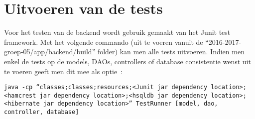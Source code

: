 \documentclass{article}
\begin{document}
\section{Uitvoeren van de tests}
Voor het testen van de backend wordt gebruik gemaakt van het Junit test framework. Met het volgende commando (uit te voeren vanuit de "`2016-2017-groep-05/app/backend/build"' folder) kan men alle tests uitvoeren. Indien men enkel de tests op de models, DAOs, controllers of database consistentie wenst uit te voeren geeft men dit mee als optie~:\\
\begin{center}
	\texttt{java -cp "`classes\test;classes\main;resources\main;<Junit jar dependency location>;<hamcrest jar dependency location>;<hsqldb jar dependency location>;<hibernate jar dependency location>"' TestRunner [model, dao, controller, database]}
\end{center}
\end{document}
